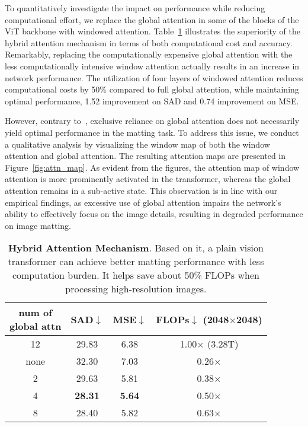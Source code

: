 \documentclass[10pt,twocolumn,letterpaper]{article}
\begin{document}
To quantitatively investigate the impact on performance while reducing computational effort, we replace the global attention in some of the blocks of the ViT backbone with windowed attention. Table~\ref{tab:hybrid} illustrates the superiority of the hybrid attention mechanism in terms of both computational cost and accuracy. Remarkably, replacing the computationally expensive global attention with the less computationally intensive window attention actually results in an increase in network performance. The utilization of four layers of windowed attention reduces computational costs by 50\% compared to full global attention, while maintaining optimal performance, 1.52 improvement on SAD and 0.74 improvement on MSE.

However, contrary to~\cite{vitdet}, exclusive reliance on global attention does not necessarily yield optimal performance in the matting task. To address this issue, we conduct a qualitative analysis by visualizing the window map of both the window attention and global attention. The resulting attention maps are presented in Figure~\ref{fig:attn_map}. As evident from the figures, the attention map of window attention is more prominently activated in the transformer, whereas the global attention remains in a sub-active state. This observation is in line with our empirical findings, as excessive use of global attention impairs the network's ability to effectively focus on the image details, resulting in degraded performance on image matting.

\begin{table}[tbp]
    \centering
    \renewcommand{\arraystretch}{1.1}
    \begin{tabular}{c|ccc}
        \toprule
        \makecell[c]{num of \\ global attn} & \multicolumn{1}{c}{SAD$\downarrow$} & \multicolumn{1}{c}{MSE$\downarrow$} &\makecell[c]{FLOPs$\downarrow$ \\ (2048$\times$2048)} \\
        \midrule
        12   & 29.83          & 6.38                & 1.00$\times$ (3.28T) \\
        \midrule
        none & 32.30         & 7.03                & 0.26$\times$ \\
        2    & 29.63        & 5.81              & 0.38$\times$ \\
        4    & \textbf{28.31} & \textbf{5.64}       & 0.50$\times$ \\
        8    & 28.40          & 5.82                & 0.63$\times$ \\
        \bottomrule
    \end{tabular}
    \caption{\textbf{Hybrid Attention Mechanism}. Based on it, a plain vision transformer can achieve better matting performance with less computation burden. It helps save about 50\% FLOPs when processing high-resolution images.}
    \label{tab:hybrid}
\end{table}
\end{document}
